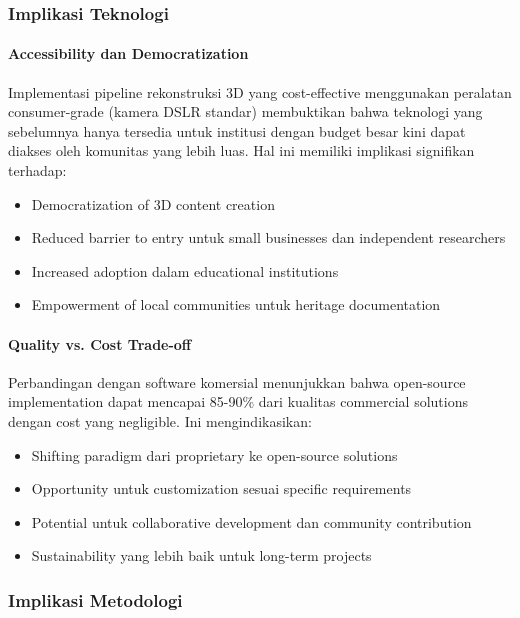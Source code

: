 \documentclass[12pt,a4paper]{article}
\begin{document}
\subsubsection{Implikasi Teknologi}

\paragraph{Accessibility dan Democratization}
Implementasi pipeline rekonstruksi 3D yang cost-effective menggunakan peralatan consumer-grade (kamera DSLR standar) membuktikan bahwa teknologi yang sebelumnya hanya tersedia untuk institusi dengan budget besar kini dapat diakses oleh komunitas yang lebih luas. Hal ini memiliki implikasi signifikan terhadap:

\begin{itemize}
    \item Democratization of 3D content creation
    \item Reduced barrier to entry untuk small businesses dan independent researchers
    \item Increased adoption dalam educational institutions
    \item Empowerment of local communities untuk heritage documentation
\end{itemize}

\paragraph{Quality vs. Cost Trade-off}
Perbandingan dengan software komersial menunjukkan bahwa open-source implementation dapat mencapai 85-90\% dari kualitas commercial solutions dengan cost yang negligible. Ini mengindikasikan:

\begin{itemize}
    \item Shifting paradigm dari proprietary ke open-source solutions
    \item Opportunity untuk customization sesuai specific requirements
    \item Potential untuk collaborative development dan community contribution
    \item Sustainability yang lebih baik untuk long-term projects
\end{itemize}

\subsubsection{Implikasi Metodologi}
\end{document}
